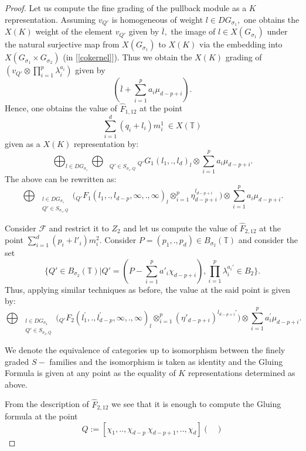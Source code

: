 \documentclass[10pt]{amsart}
\numberwithin{equation}{subsection}
\begin{document}
\begin{proof}
Let us compute the fine grading of the pullback module as a $K$ representation. Assuming $v_{Q'}$ is homogeneous of weight $l\in DG_{\sigma_1},$ one obtains the $X(K)$ weight of the element $v_{Q'}$ given by $\overline{l},$ the image of $l\in X(G_{\sigma_1})$ under the natural surjective map from $X(G_{\sigma_1})$ to $X(K)$ via the embedding into $X(G_{\sigma_1}\times G_{\sigma_2})$ (in [\ref{cokernel}]). Thus we obtain the $X(K)$ grading of $(v_{Q'}\otimes \prod_{i=1}^{p}\lambda_{i}^{a_i})$ given by $$(\overline{l}+\sum_{i=1}^{p}a_{i}\mu_{d-p+i}).$$ Hence, one obtains the value of $\hat{F}_{1,12}$ at the point $$\sum_{i=1}^{d}(q_i+l_i)m^1_i\ \in X(\mathbb{T})$$ given as a $X(K)$ representation by:
$$\bigoplus_{l\in DG_{\sigma_1}}\bigoplus_{\quad Q'\in S_{\sigma_1,Q}}{}_{Q'}G_{1}(l_1,.,l_d)_{l}\otimes {\sum_{i=1}^{p}a_i\mu_{d-p+i}}.$$ The above can be rewritten as:
$$\bigoplus_{\begin{array}{cc}
     &  l\in DG_{\sigma_1}\\
     & Q'\in S_{\sigma_1,Q}
\end{array}} \big ({}_{Q'}F_{1}(l_1,.,l_{d-p},\infty,.,\infty)_{l} \otimes_{i=1}^{p}\eta_{d-p+i}^{l_{d-p+i}}\ \bigl)\otimes \sum_{i=1}^{p}a_i\mu_{d-p+i}.$$\par
Consider $\mathscr{F}$ and restrict it to $Z_2$ and let us compute the value of $\hat{F}_{2,12}$ at the point $\sum_{i=1}^{d}(p_i+l'_i)m^2_{i}.$\newline
Consider $P=(p_1,.,p_d)\in B_{\sigma_2}(\mathbb{T})$ and consider the set $$\bigl\{Q'\in B_{\sigma_2}(\mathbb{T})|Q'=(P-\sum_{i=1}^{p}a'_i\chi_{d-p+i}),\prod_{i=1}^{p}\lambda_{i}^{a_{i}'}\in B_{2}\bigl\}.$$ Thus, applying similar techniques as before, the value at the said point is given by:
$$\bigoplus_{{\begin{array}{cc}
     &  l\in DG_{\sigma_2}\\
     & Q'\in S_{\sigma_2,Q}
\end{array}}}\big ({}_{Q'}F_{2}(l_1^{'},.,l_{d-p}^{'},\infty,.,\infty)_{l}\otimes _{i=1}^{p}(\eta'_{d-p+i})^{l_{d-p+i}'}\big )\otimes \sum_{i=1}^{p}a_i^{'}\mu_{d-p+i}.$$
\par 
We denote the equivalence of categories up to isomorphism between the finely graded $S-$ families and the isomorphism is taken as identity and the Gluing Formula is given at any point as the equality of $K$ representations determined as above. \par
From the description of $\hat{F}_{2,12}$ we see that it is enough to compute the Gluing formula at the point $$Q:=[\chi_1,..,\chi_{d-p}\  \chi_{d-p+1},..,\chi_{d}]\begin{pmatrix}

\end{pmatrix}$$
\end{proof}
\end{document}
